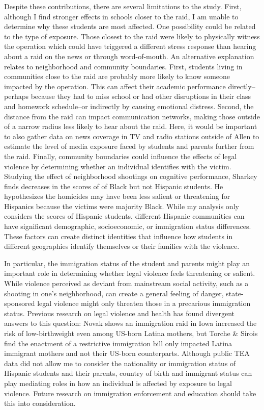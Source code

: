\documentclass[hidelinks,twoside]{article}
\begin{document}
Despite these contributions, there are several limitations to the study. First, although I find stronger effects in schools closer to the raid, I am unable to determine why these students are most affected. One possibility could be related to the type of exposure. Those closest to the raid were likely to physically witness the operation which could have triggered a different stress response than hearing about a raid on the news or through word-of-mouth. An alternative explanation relates to neighborhood and community boundaries. First, students living in communities close to the raid are probably more likely to know someone impacted by the operation. This can affect their academic performance directly–perhaps because they had to miss school or had other disruptions in their class and homework schedule–or indirectly by causing emotional distress. Second, the distance from the raid can impact communication networks, making those outside of a narrow radius less likely to hear about the raid. Here, it would be important to also gather data on news coverage in TV and radio stations outside of Allen to estimate the level of media exposure faced by students and parents further from the raid. Finally, community boundaries could influence the effects of legal violence by determining whether an individual identifies with the victim. Studying the effect of neighborhood shootings on cognitive performance, Sharkey \citep{sharkey_2010_the} finds decreases in the scores of of Black but not Hispanic students. He hypothesizes the homicides may have been less salient or threatening for Hispanics because the victims were majority Black. While my analysis only considers the scores of Hispanic students, different Hispanic communities can have significant demographic, socioeconomic, or immigration status differences. These factors can create distinct identities that influence how students in different geographies identify themselves or their families with the violence.

In particular, the immigration status of the student and parents might play an important role in determining whether legal violence feels threatening or salient. While violence perceived as deviant from mainstream social activity, such as a shooting in one's neighborhood, can create a general feeling of danger, state-sponsored legal violence might only threaten those in a precarious immigration status. Previous research on legal violence and health has found divergent answers to this question: Novak \citeyearpar{novak_2017_change} shows an immigration raid in Iowa increased the risk of low-birthweight even among US-born Latina mothers, but Torche \& Sirois \citeyearpar{torche_2019_restrictive} find the enactment of a restrictive immigration bill only impacted Latina immigrant mothers and not their US-born counterparts. Although public TEA data did not allow me to consider the nationality or immigration status of Hispanic students and their parents, country of birth and immigrant status can play mediating roles in how an individual is affected by exposure to legal violence. Future research on immigration enforcement and education should take this into consideration.
\end{document}
